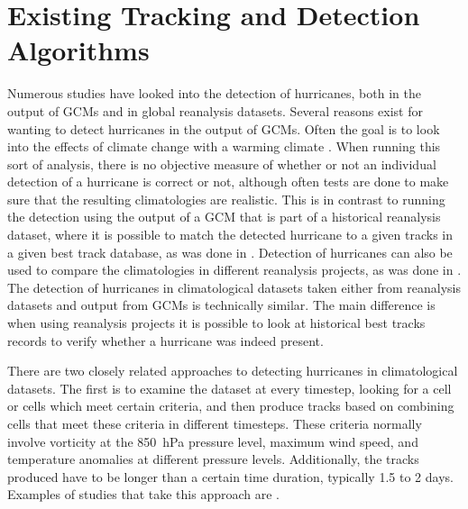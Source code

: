 \documentclass[pdftex,12pt,a4paper]{report}
\begin{document}
\section{Existing Tracking and Detection Algorithms}


Numerous studies have looked into the detection of hurricanes, both in the output of GCMs and in
global reanalysis datasets. Several reasons exist for wanting to detect hurricanes in the output of
GCMs. Often the goal is to look into the effects of climate change with a warming climate
\parencite{bengtsson1996will, sugi2002influence, yoshimura2006influence}. When running this sort of
analysis, there is no objective measure of whether or not an individual detection of a hurricane is
correct or not, although often tests are done to make sure that the resulting climatologies are
realistic. This is in contrast to running the detection using the output of a GCM that is part of a
historical reanalysis dataset, where it is possible to match the detected hurricane to a given
tracks in a given best track database, as was done in \textcite{walsh1997objective}. Detection of
hurricanes can also be used to compare the climatologies in different reanalysis projects, as was
done in \textcite{trigo2006climatology}. The detection of hurricanes in climatological datasets
taken either from reanalysis datasets and output from GCMs is technically similar. The main
difference is when using reanalysis projects it is possible to look at historical best tracks
records to verify whether a hurricane was indeed present.

There are two closely related approaches to detecting hurricanes in climatological datasets. The
first is to examine the dataset at every timestep, looking for a cell or cells which meet certain
criteria, and then produce tracks based on combining cells that meet these criteria in different
timesteps. These criteria normally involve vorticity at the \SI{850}{hPa} pressure level,
maximum wind speed, and temperature anomalies at different pressure levels. Additionally, the tracks
produced have to be longer than a certain time duration, typically 1.5 to 2 days. Examples of
studies that take this approach are \textcite{bengtsson1995hurricane, walsh1997objective}.
\end{document}
